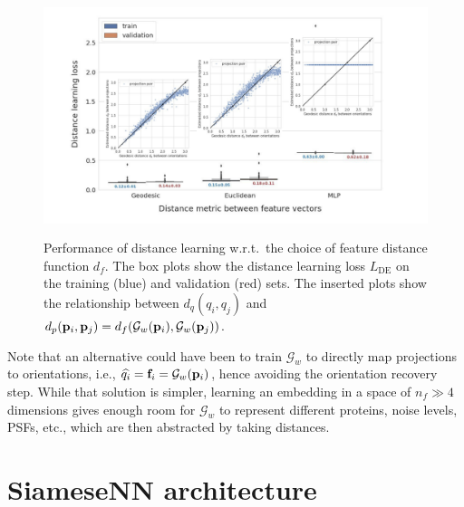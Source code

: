 \begin{figure}
    \centering
    \includegraphics[height=7cm]{figures/geo_eucl_mlp_distance_metric.pdf}
    \caption{
        Performance of distance learning w.r.t.\ the choice of feature distance function $d_f$.
        The box plots show the distance learning loss $L_\text{DE}$  on the training (blue) and validation (red) sets.
        The inserted plots show the relationship between $d_q(q_i, q_j)$ and $d_p(\mathbf{p}_i, \mathbf{p}_j) = d_f(\mathcal{G}_w(\mathbf{p}_i), \mathcal{G}_w(\mathbf{p}_j))$.
    }\label{fig:geo-eucl-mlp}
\end{figure}

Note that an alternative could have been to train $\mathcal{G}_w$ to directly map projections to orientations, i.e., $\widehat{q_i} = \mathbf{f}_i = \mathcal{G}_w(\mathbf{p}_i)$, hence avoiding the orientation recovery step.
While that solution is simpler, learning an embedding in a space of $n_f \gg 4$ dimensions gives enough room for $\mathcal{G}_w$ to represent different proteins, noise levels, PSFs, etc., which are then abstracted by taking distances.

\clearpage
\section{SiameseNN architecture}\label{apx:siamese-architecture}

